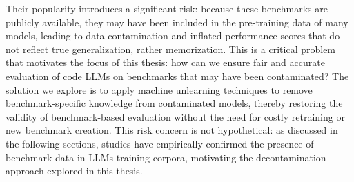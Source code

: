 \documentclass[mscthesis]{usiinfthesis}
\begin{document}
\par\vspace{1em}
Their popularity introduces a significant risk: because these benchmarks are publicly available, they may have been included in the pre-training data of many models, leading to data contamination and inflated performance scores that do not reflect true generalization, rather memorization. This is a critical problem that motivates the focus of this thesis: how can we ensure fair and accurate evaluation of code LLMs on benchmarks that may have been contaminated? The solution we explore is to apply machine unlearning techniques to remove benchmark-specific knowledge from contaminated models, thereby restoring the validity of benchmark-based evaluation without the need for costly retraining or new benchmark creation.
This risk concern is not hypothetical: as discussed in the following sections, studies have empirically confirmed the presence of benchmark data in LLMs training corpora, motivating the decontamination approach explored in this thesis.
\end{document}
